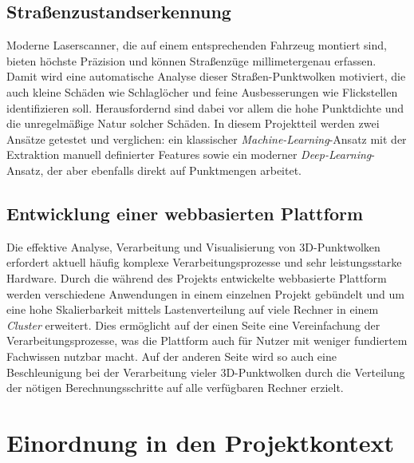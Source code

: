 \subsection{Straßenzustandserkennung}

Moderne Laserscanner, die auf einem entsprechenden Fahrzeug montiert sind, bieten höchste Präzision und können Straßenzüge millimetergenau erfassen. Damit wird eine automatische Analyse dieser Straßen-Punktwolken motiviert, die auch kleine Schäden wie Schlaglöcher und feine Ausbesserungen wie Flickstellen identifizieren soll. Herausfordernd sind dabei vor allem die hohe Punktdichte und die unregelmäßige Natur solcher Schäden. In diesem Projektteil werden zwei Ansätze getestet und verglichen: ein klassischer \textit{Machine-Learning}-Ansatz mit der Extraktion manuell definierter Features sowie ein moderner \textit{Deep-Learning}-Ansatz, der aber ebenfalls direkt auf Punktmengen arbeitet.

\subsection{Entwicklung einer webbasierten Plattform}

Die effektive Analyse, Verarbeitung und Visualisierung von 3D-Punktwolken erfordert aktuell häufig komplexe Verarbeitungsprozesse und sehr leistungsstarke Hardware. Durch die während des Projekts entwickelte webbasierte Plattform werden verschiedene Anwendungen in einem einzelnen Projekt gebündelt und um eine hohe Skalierbarkeit mittels Lastenverteilung auf viele Rechner in einem \textit{Cluster} erweitert. Dies ermöglicht auf der einen Seite eine Vereinfachung der Verarbeitungsprozesse, was die Plattform auch für Nutzer mit weniger fundiertem Fachwissen nutzbar macht. Auf der anderen Seite wird so auch eine Beschleunigung bei der Verarbeitung vieler 3D-Punktwolken durch die Verteilung der nötigen Berechnungsschritte auf alle verfügbaren Rechner erzielt.

\section{Einordnung in den Projektkontext}

